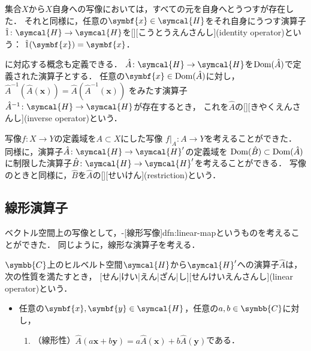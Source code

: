 \documentclass[../sotsu.tex]{subfiles}
\begin{document}
\par

集合$X$から$X$自身への写像においては，すべての元を自身へとうつすが存在した．
それと同様に，任意の$\symbf{x} \in \symcal{H}$をそれ自身にうつす演算子
$\idop \colon \symcal{H} \to \symcal{H}$を[][こうとうえんさんし](identity operator)という：
$\idop(\symbf{x}) = \symbf{x}$．

に対応する概念も定義できる．
$\hat{A} \colon \symcal{H} \to \symcal{H}$を$\operatorname{Dom}(\hat{A})$で定義された演算子とする．
任意の$\symbf{x} \in \domain(\hat{A})$に対し，
$\hat{A}^{-1} ( \hat{A} (\symbf{x}) ) = \hat{A} ( \hat{A}^{-1} (\symbf{x}) ) $
をみたす演算子$\hat{A}^{-1} \colon \symcal{H} \to \symcal{H}$が存在するとき，
これを$\hat{A}$の[][きやくえんさんし](inverse operator)という．

写像$f \colon X \to Y$の定義域を$A \subset X$にした写像
$f \vert_A \colon A \to Y$を考えることができた．
同様に，演算子$\hat{A} \colon \symcal{H} \to \symcal{H}'$の定義域を
$\operatorname{Dom}(\hat{B}) \subset \operatorname{Dom}(\hat{A})$に制限した演算子$\hat{B} \colon \symcal{H} \to \symcal{H}'$を考えることができる．
写像のときと同様に，$\hat{B}$を$\hat{A}$の[][せいけん](restriction)という．


\subsection{線形演算子}
\label{sec:linear-operator}

ベクトル空間上の写像として，-[線形写像]{dfn:linear-map}というものを考えることができた．
同じように，線形な演算子を考える．
\begin{definition}[線形演算子]
    $\symbb{C}$上のヒルベルト空間$\symcal{H}$から$\symcal{H}'$への演算子$\hat{A}$は，次の性質を満たすとき，
    [せん|けい|えん|ざん|し][せんけいえんさんし](linear operator)という．
    \begin{itemize}
        \item 任意の$\symbf{x}, \symbf{y} \in \symcal{H}$，任意の$a, b \in \symbb{C}$に対し，
        \begin{enumerate}
            \item （線形性）$\hat{A}( a \symbf{x} + b \symbf{y} ) = a \hat{A} (\symbf{x}) + b \hat{A} (\symbf{y})$である．
        \end{enumerate}
    \end{itemize}
\end{definition}
\end{document}
